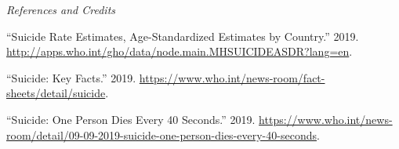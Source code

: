 \documentclass[]{article}
\begin{document}
\emph{References and Credits}

\hypertarget{refs}{}
\hypertarget{ref-whodat2019}{}
``Suicide Rate Estimates, Age-Standardized Estimates by Country.'' 2019.
\url{http://apps.who.int/gho/data/node.main.MHSUICIDEASDR?lang=en}.

\hypertarget{ref-stats2019}{}
``Suicide: Key Facts.'' 2019.
\url{https://www.who.int/news-room/fact-sheets/detail/suicide}.

\hypertarget{ref-who2019}{}
``Suicide: One Person Dies Every 40 Seconds.'' 2019.
\url{https://www.who.int/news-room/detail/09-09-2019-suicide-one-person-dies-every-40-seconds}.
\end{document}
